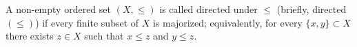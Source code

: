 A non-empty ordered set $(X, \leq)$ is called directed under $\leq$ (briefly, directed $(\leq)$) if every finite subset of $X$ is majorized; equivalently, for every $\{x, y\} \subset X$ there exists $z \in X$ such that $x \leq z$ and $y \leq z$.
